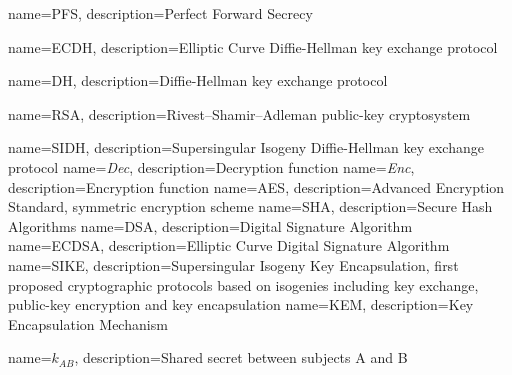
{
    name=PFS,
    description={Perfect Forward Secrecy}
}

{
    name=ECDH,
    description={Elliptic Curve Diffie-Hellman key exchange protocol}
}

{
    name=DH,
    description={Diffie-Hellman key exchange protocol}
}

{
    name=RSA,
    description={Rivest–Shamir–Adleman public-key cryptosystem}
}

{
    name=SIDH,
    description={Supersingular Isogeny Diffie-Hellman key exchange protocol}
}
{
    name=\textit{Dec},
    description={Decryption function}
}
{
    name=\textit{Enc},
    description={Encryption function}
}
{
    name=AES,
    description={Advanced Encryption Standard, symmetric encryption scheme}
}
{
    name=SHA,
    description={Secure Hash Algorithms}
}
{
    name=DSA,
    description={Digital Signature Algorithm}
}
{
    name=ECDSA,
    description={Elliptic Curve Digital Signature Algorithm}
}
{
    name=SIKE,
    description={Supersingular Isogeny Key Encapsulation, first proposed cryptographic protocols based on isogenies including key exchange, public-key encryption and key encapsulation}
}
{
    name=KEM,
    description={Key Encapsulation Mechanism}
}

{
    name=$k_{AB}$,
    description={Shared secret between subjects A and B}
}

